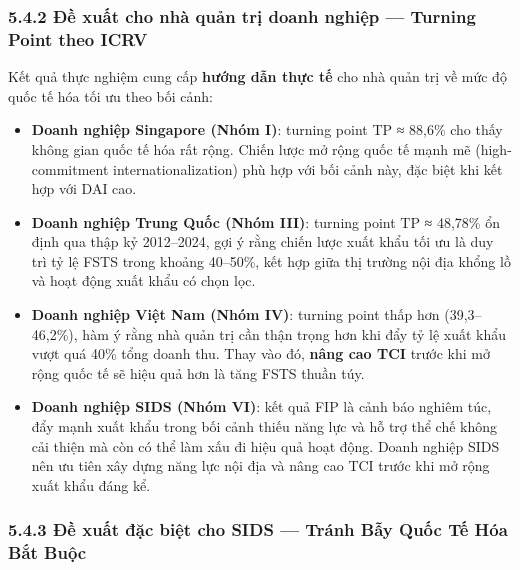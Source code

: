 \documentclass[12pt,a4paper]{article}
\begin{document}
\hypertarget{542-ux111ux1ec1-xuux1ea5t-cho-nhuxe0-quux1ea3n-trux1ecb-doanh-nghiux1ec7p--turning-point-theo-icrv}{%
\subsubsection{5.4.2 Đề xuất cho nhà quản trị doanh nghiệp --- Turning
Point theo
ICRV}\label{542-ux111ux1ec1-xuux1ea5t-cho-nhuxe0-quux1ea3n-trux1ecb-doanh-nghiux1ec7p--turning-point-theo-icrv}}

Kết quả thực nghiệm cung cấp \textbf{hướng dẫn thực tế} cho nhà quản trị
về mức độ quốc tế hóa tối ưu theo bối cảnh:

\begin{itemize}
\item
  \textbf{Doanh nghiệp Singapore (Nhóm I)}: turning point TP ≈ 88,6\%
  cho thấy không gian quốc tế hóa rất rộng. Chiến lược mở rộng quốc tế
  mạnh mẽ (high-commitment internationalization) phù hợp với bối cảnh
  này, đặc biệt khi kết hợp với DAI cao.
\item
  \textbf{Doanh nghiệp Trung Quốc (Nhóm III)}: turning point TP ≈
  48,78\% ổn định qua thập kỷ 2012--2024, gợi ý rằng chiến lược xuất
  khẩu tối ưu là duy trì tỷ lệ FSTS trong khoảng 40--50\%, kết hợp giữa
  thị trường nội địa khổng lồ và hoạt động xuất khẩu có chọn lọc.
\item
  \textbf{Doanh nghiệp Việt Nam (Nhóm IV)}: turning point thấp hơn
  (39,3--46,2\%), hàm ý rằng nhà quản trị cần thận trọng hơn khi đẩy tỷ
  lệ xuất khẩu vượt quá 40\% tổng doanh thu. Thay vào đó, \textbf{nâng
  cao TCI} trước khi mở rộng quốc tế sẽ hiệu quả hơn là tăng FSTS thuần
  túy.
\item
  \textbf{Doanh nghiệp SIDS (Nhóm VI)}: kết quả FIP là cảnh báo nghiêm
  túc, đẩy mạnh xuất khẩu trong bối cảnh thiếu năng lực và hỗ trợ thể
  chế không cải thiện mà còn có thể làm xấu đi hiệu quả hoạt động. Doanh
  nghiệp SIDS nên ưu tiên xây dựng năng lực nội địa và nâng cao TCI
  trước khi mở rộng xuất khẩu đáng kể.
\end{itemize}

\hypertarget{543-ux111ux1ec1-xuux1ea5t-ux111ux1eb7c-biux1ec7t-cho-sids--truxe1nh-bux1eaby-quux1ed1c-tux1ebf-huxf3a-bux1eaft-buux1ed9c}{%
\subsubsection{5.4.3 Đề xuất đặc biệt cho SIDS --- Tránh Bẫy Quốc Tế Hóa
Bắt
Buộc}\label{543-ux111ux1ec1-xuux1ea5t-ux111ux1eb7c-biux1ec7t-cho-sids--truxe1nh-bux1eaby-quux1ed1c-tux1ebf-huxf3a-bux1eaft-buux1ed9c}}
\end{document}
